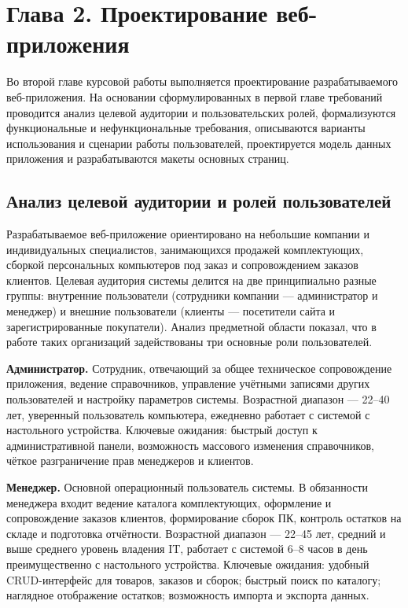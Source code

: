 \section*{Глава 2. Проектирование веб-приложения}

Во второй главе курсовой работы выполняется проектирование разрабатываемого веб-приложения. На основании сформулированных в первой главе требований проводится анализ целевой аудитории и пользовательских ролей, формализуются функциональные и нефункциональные требования, описываются варианты использования и сценарии работы пользователей, проектируется модель данных приложения и разрабатываются макеты основных страниц.

\subsection{Анализ целевой аудитории и ролей пользователей}

Разрабатываемое веб-приложение ориентировано на небольшие компании и индивидуальных специалистов, занимающихся продажей комплектующих, сборкой персональных компьютеров под заказ и сопровождением заказов клиентов. Целевая аудитория системы делится на две принципиально разные группы: внутренние пользователи (сотрудники компании --- администратор и менеджер) и внешние пользователи (клиенты --- посетители сайта и зарегистрированные покупатели). Анализ предметной области показал, что в работе таких организаций задействованы три основные роли пользователей.

\textbf{Администратор.} Сотрудник, отвечающий за общее техническое сопровождение приложения, ведение справочников, управление учётными записями других пользователей и настройку параметров системы. Возрастной диапазон --- 22--40 лет, уверенный пользователь компьютера, ежедневно работает с системой с настольного устройства. Ключевые ожидания: быстрый доступ к административной панели, возможность массового изменения справочников, чёткое разграничение прав менеджеров и клиентов.

\textbf{Менеджер.} Основной операционный пользователь системы. В обязанности менеджера входит ведение каталога комплектующих, оформление и сопровождение заказов клиентов, формирование сборок ПК, контроль остатков на складе и подготовка отчётности. Возрастной диапазон --- 22--45 лет, средний и выше среднего уровень владения IT, работает с системой 6--8 часов в день преимущественно с настольного устройства. Ключевые ожидания: удобный CRUD-интерфейс для товаров, заказов и сборок; быстрый поиск по каталогу; наглядное отображение остатков; возможность импорта и экспорта данных.

